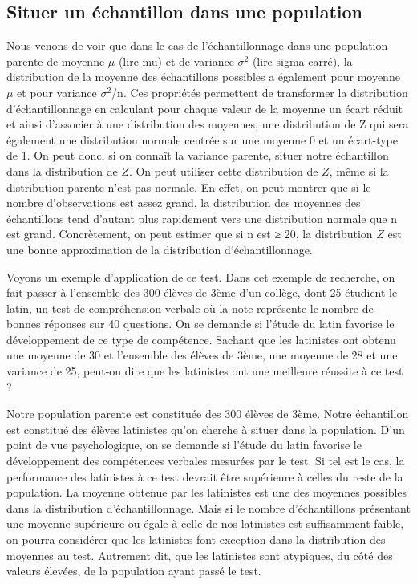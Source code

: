 \documentclass[]{book}
\theoremstyle{definition}
\theoremstyle{definition}
\theoremstyle{definition}
\theoremstyle{remark}
\begin{document}
\hypertarget{situer-un-echantillon-dans-une-population-1}{%
\subsection{Situer un échantillon dans une
population}\label{situer-un-echantillon-dans-une-population-1}}

Nous venons de voir que dans le cas de l'échantillonnage dans une
population parente de moyenne \(\mu\) (lire mu) et de variance
\(\sigma ^{2}\) (lire sigma carré), la distribution de la moyenne des
échantillons possibles a également pour moyenne \(\mu\) et pour variance
\(\sigma ^{2}\)/n. Ces propriétés permettent de transformer la
distribution d'échantillonnage en calculant pour chaque valeur de la
moyenne un écart réduit et ainsi d'associer à une distribution des
moyennes, une distribution de Z qui sera également une distribution
normale centrée sur une moyenne 0 et un écart-type de 1. On peut donc,
si on connaît la variance parente, situer notre échantillon dans la
distribution de \(Z\). On peut utiliser cette distribution de \(Z\),
même si la distribution parente n'est pas normale. En effet, on peut
montrer que si le nombre d'observations est assez grand, la distribution
des moyennes des échantillons tend d'autant plus rapidement vers une
distribution normale que n est grand. Concrètement, on peut estimer que
si n est ≥ 20, la distribution \(Z\) est une bonne approximation de la
distribution d`échantillonnage.

Voyons un exemple d'application de ce test. Dans cet exemple de
recherche, on fait passer à l'ensemble des 300 élèves de 3ème d'un
collège, dont 25 étudient le latin, un test de compréhension verbale où
la note représente le nombre de bonnes réponses sur 40 questions. On se
demande si l'étude du latin favorise le développement de ce type de
compétence. Sachant que les latinistes ont obtenu une moyenne de 30 et
l'ensemble des élèves de 3ème, une moyenne de 28 et une variance de 25,
peut-on dire que les latinistes ont une meilleure réussite à ce test ?

Notre population parente est constituée des 300 élèves de 3ème. Notre
échantillon est constitué des élèves latinistes qu'on cherche à situer
dans la population. D'un point de vue psychologique, on se demande si
l'étude du latin favorise le développement des compétences verbales
mesurées par le test. Si tel est le cas, la performance des latinistes à
ce test devrait être supérieure à celles du reste de la population. La
moyenne obtenue par les latinistes est une des moyennes possibles dans
la distribution d'échantillonnage. Mais si le nombre d'échantillons
présentant une moyenne supérieure ou égale à celle de nos latinistes est
suffisamment faible, on pourra considérer que les latinistes font
exception dans la distribution des moyennes au test. Autrement dit, que
les latinistes sont atypiques, du côté des valeurs élevées, de la
population ayant passé le test.
\end{document}
